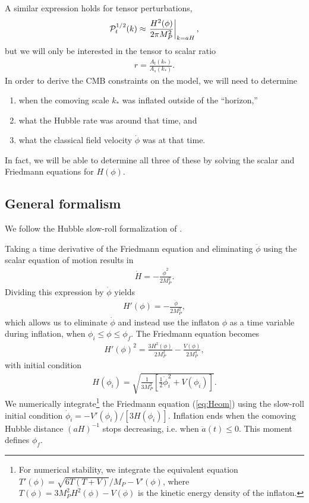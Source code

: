 \documentclass[aps,amsfonts,amsmath,prd,preprint,nofootinbib,superscriptaddress]{revtex4}
\newcommand{\Mp}{{M_{P}}}
\newcommand{\MMp}{{M_P^2}}
\begin{document}
A similar expression holds for tensor perturbations, 
\begin{align}
{\cal P}_{t}^{1/2}(k) \approx \left.\frac{H^2(\phi)}{2\pi\MMp}\right|_{k = a H},
\end{align}
but we will only be interested in the tensor to scalar ratio
\begin{align}
r = \frac{A_t(k_\ast)}{A_s(k_\ast)}.
\end{align}
In order to derive the CMB constraints on the model, we will need to determine 
\begin{enumerate}
\item when the comoving scale $k_\ast$ was inflated outside of the ``horizon,''
\item what the Hubble rate was around that time, and
\item what the classical field velocity $\dot \phi$ was at that time.
\end{enumerate}
In fact, we will be able to determine all three of these by solving the scalar and Friedmann equations for $H(\phi)$.


\subsection{General formalism}


We follow the Hubble slow-roll formalization of \cite{Liddle:1994dx}.  


Taking a time derivative of the Friedmann equation 
and eliminating $\ddot \phi$ using the scalar equation of motion results in
\begin{align}
\dot H = -\frac{\dot \phi^2}{2\MMp}.
\end{align}
Dividing this expression by $\dot\phi$ yields
\begin{align}\label{eq:phidot}
H'(\phi) = -\frac{\dot \phi}{2\MMp},
\end{align}
which allows us to eliminate $\dot \phi$ and instead use
the inflaton $\phi$ as a time variable during inflation, when $\phi_i \leq \phi \leq \phi_f$.  The Friedmann equation becomes
\begin{align}\label{eq:Heom}
H'(\phi)^2 = \frac{3 H^2(\phi)}{2\MMp} - \frac{V(\phi)}{2 M^4_P},
\end{align}
with initial condition
\begin{align}
H(\phi_i) = \sqrt{\frac{1}{3\MMp}\left[\tfrac{1}{2}\dot \phi_i^2 + V(\phi_i)  \right]}.
\end{align}
We numerically integrate\footnote{For numerical stability, we integrate the equivalent equation $T'(\phi) = \sqrt{6T\left(T+V\right)}/\Mp - V'(\phi)$, where $T(\phi) = 3\MMp H^2(\phi) - V(\phi)$ is the kinetic energy density of the inflaton.}
the Friedmann equation (\ref{eq:Heom}) using the slow-roll initial condition ${\dot \phi_i = -V'(\phi_i)/[3H(\phi_i)]}$.  Inflation ends when the 
comoving Hubble distance $\left(a H\right)^{-1}$ stops decreasing, i.e. when ${\ddot a(t) \leq 0}$.  This moment defines $\phi_f$. 
\end{document}
